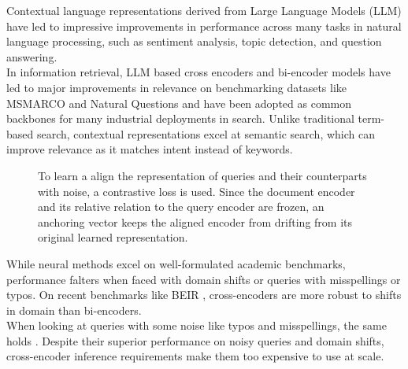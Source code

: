 Contextual language representations derived from Large Language Models (LLM) have led to impressive improvements in performance across many tasks in natural language processing, such as sentiment analysis, topic detection, and question answering. \\
In information retrieval, LLM based cross encoders and bi-encoder models have led to major improvements in relevance on benchmarking datasets like MSMARCO \cite{nguyen2016ms} and Natural Questions \cite{Kwiatkowski2019NaturalQA} and have been adopted as common backbones for many industrial deployments in search. Unlike traditional term-based search, contextual representations excel at semantic search, which can improve relevance as it matches intent instead of keywords. \\
\begin{figure}
    {}
  \caption{To learn a align the representation of queries and their counterparts with noise, a contrastive loss is used. Since the document encoder and its relative relation to the query encoder are frozen, an anchoring vector keeps the aligned encoder from drifting from its original learned representation.}
  \label{fig:fig1}
\end{figure}
While neural methods excel on well-formulated academic benchmarks, performance falters when faced with domain shifts or queries with misspellings or typos. On recent benchmarks like BEIR \cite{Thakur2021BEIRAH}, cross-encoders are more robust to shifts in domain than bi-encoders. \\
When looking at queries with some noise like typos and misspellings, the same holds \cite{zhuang-zuccon-2021-dealing}. Despite their superior performance on noisy queries and domain shifts, cross-encoder inference requirements make them too expensive to use at scale. \\
